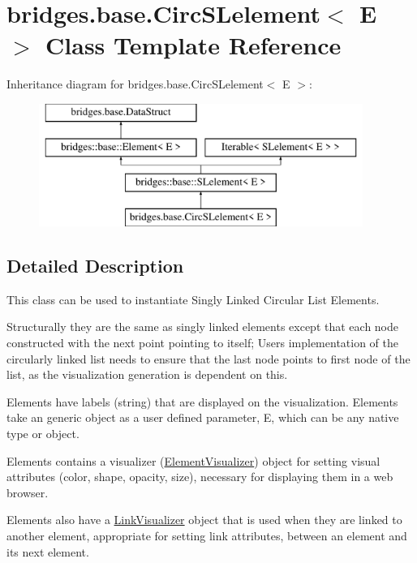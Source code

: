 \hypertarget{classbridges_1_1base_1_1_circ_s_lelement}{}\section{bridges.\+base.\+Circ\+S\+Lelement$<$ E $>$ Class Template Reference}
\label{classbridges_1_1base_1_1_circ_s_lelement}
Inheritance diagram for bridges.\+base.\+Circ\+S\+Lelement$<$ E $>$\+:\begin{figure}[H]
\begin{center}
\leavevmode
\includegraphics[height=4.000000cm]{classbridges_1_1base_1_1_circ_s_lelement}
\end{center}
\end{figure}


\subsection{Detailed Description}
This class can be used to instantiate Singly Linked Circular List Elements. 

Structurally they are the same as singly linked elements except that each node constructed with the next point pointing to itself; User\textquotesingle{}s implementation of the circularly linked list needs to ensure that the last node points to first node of the list, as the visualization generation is dependent on this.

Elements have labels (string) that are displayed on the visualization. Elements take an generic object as a user defined parameter, E, which can be any native type or object.

Elements contains a visualizer (\hyperlink{classbridges_1_1base_1_1_element_visualizer}{Element\+Visualizer}) object for setting visual attributes (color, shape, opacity, size), necessary for displaying them in a web browser.

Elements also have a \hyperlink{classbridges_1_1base_1_1_link_visualizer}{Link\+Visualizer} object that is used when they are linked to another element, appropriate for setting link attributes, between an element and its next element.

